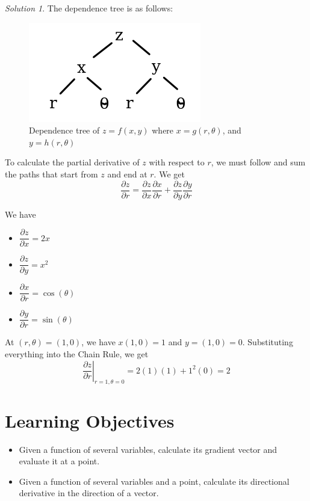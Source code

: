 \documentclass[
]{book}
\providecommand{\tightlist}{%
  \setlength{\itemsep}{0pt}\setlength{\parskip}{0pt}}
\theoremstyle{definition}
\theoremstyle{definition}
\theoremstyle{definition}
\theoremstyle{definition}
\theoremstyle{remark}
\newtheorem*{solution}{Solution}
\begin{document}
\begin{solution}

The dependence tree is as follows:

\begin{figure}

{\centering \includegraphics[width=0.2\linewidth]{images/recap-de} 

}

\caption{Dependence tree of $z=f(x,y)$ where $x=g(r,\theta)$, and $y=h(r,\theta)$}\label{fig:unnamed-chunk-15}
\end{figure}

To calculate the partial derivative of \(z\) with respect to \(r\), we must follow and sum the paths that start from \(z\) and end at \(r\). We get \[\dfrac{\partial z}{\partial r} = \dfrac{\partial z}{\partial x}\dfrac{\partial x}{\partial r}+ \dfrac{\partial z}{\partial y}\dfrac{\partial y}{\partial r}\]

We have

\begin{itemize}
\tightlist
\item
  \(\dfrac{\partial z}{\partial x} = 2x\)
\item
  \(\dfrac{\partial z}{\partial y} = x^2\)
\item
  \(\dfrac{\partial x}{\partial r} = \cos(\theta)\)
\item
  \(\dfrac{\partial y}{\partial r} = \sin(\theta)\)
\end{itemize}

At \((r,\theta)=(1,0)\), we have \(x(1,0)=1\) and \(y=(1,0)=0\). Substituting everything into the Chain Rule, we get \[\left .\dfrac{\partial z}{\partial r}\right|_{r=1, \theta=0} =2(1)(1)+ 1^2(0)=2\]

\end{solution}

\hypertarget{learning-objectives-6}{%
\section{Learning Objectives}\label{learning-objectives-6}}

\begin{itemize}
\tightlist
\item
  Given a function of several variables, calculate its gradient vector and evaluate it at a point.
\item
  Given a function of several variables and a point, calculate its directional derivative in the direction of a vector.
\end{itemize}
\end{document}
